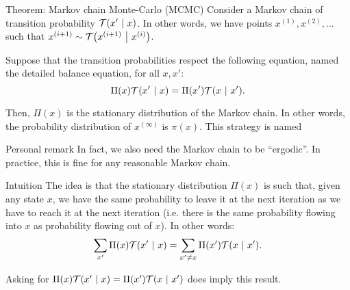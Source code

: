 \documentclass[a4paper]{article}
\begin{document}
\begin{parag}{Theorem: Markov chain Monte-Carlo (MCMC)}
    Consider a Markov chain of transition probability $\mathcal{T}\left(x' \suchthat x\right)$. In other words, we have points $x^{\left(1\right)}, x^{\left(2\right)}, \ldots$ such that $x^{\left(i+1\right)} \followsdistr \mathcal{T}\left(x^{\left(i+1\right)} \suchthat x^{\left(i\right)}\right)$.

    Suppose that the transition probabilities respect the following equation, named the detailed balance equation, for all $x, x'$: 
    \[\Pi\left(x\right) \mathcal{T}\left(x' \suchthat x\right) = \Pi\left(x'\right) \mathcal{T}\left(x \suchthat x'\right).\]
    
    Then, $\Pi\left(x\right)$ is the stationary distribution of the Markov chain. In other words, the probability distribution of $x^{\left(\infty\right)}$ is $\pi\left(x\right)$. This strategy is named 


    \begin{subparag}{Personal remark}
        In fact, we also need the Markov chain to be ``ergodic''. In practice, this is fine for any reasonable Markov chain. 
    \end{subparag}

    \begin{subparag}{Intuition}
        The idea is that the stationary distribution $\Pi\left(x\right)$ is such that, given any state $x$, we have the same probability to leave it at the next iteration as we have to reach it at the next iteration (i.e. there is the same probability flowing into $x$ as probability flowing out of $x$). In other words:
        \[\sum_{x'} \Pi\left(x\right) \mathcal{T}\left(x' \suchthat x\right) = \sum_{x' \neq x} \Pi\left(x'\right) \mathcal{T}\left(x \suchthat x'\right).\]

        Asking for $\Pi\left(x\right) \mathcal{T}\left(x' \suchthat x\right) = \Pi\left(x'\right) \mathcal{T}\left(x \suchthat x'\right)$ does imply this result.
    \end{subparag}
\end{parag}
\end{document}
